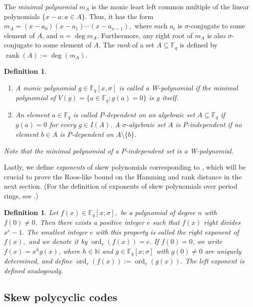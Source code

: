 \documentclass[12pt,paper]{article}
\theoremstyle{plain}
\newtheorem{definition}[theorem]{Definition}
\newcommand{\Fq}{\mathbb{F}_{q}}
\DeclareMathOperator{\ord}{ord}
\begin{document}
The \emph{minimal polynomial} $m_A$ is the monic least left common multiple of the linear polynomials $\{x - a : a \in A\}$. Thus, it has the form  
$
m_A = (x - a_0)(x - a_1) \cdots (x - a_{n-1}),
$
where each $a_i$ is $\sigma$-conjugate to some element of $A$, and $n = \deg m_A$. Furthermore, any right root of $m_A$ is also $\sigma$-conjugate to some element of $A$.
The \emph{rank} of a set $A \subseteq \mathbb{F}_q$ is defined by $\operatorname{rank}(A) := \deg(m_A)$.

\begin{definition}
\begin{enumerate}
    \item 
A monic polynomial $g \in \mathbb{F}_q[x, \sigma]$ is called a \emph{W-polynomial} if the minimal polynomial of $V(g) = \{ a \in \mathbb{F}_q : g(a) = 0 \}$ is $g$ itself. 
\item 
An element $a \in \mathbb{F}_q$ is called \emph{$P$-dependent} on an algebraic set $A\subseteq \Fq$ if $g(a) = 0$ for every $g \in I(A)$. A $\sigma$-algebraic set $A$ is \emph{$P$-independent} if no element $b \in A$ is $P$-dependent on $A \setminus \{b\}$. 
\end{enumerate}    
Note that the minimal polynomial of a $P$-independent set is a W-polynomial.
\end{definition}

Lastly, we define \emph{exponents} of skew polynomials corresponding to \cite[Definition 3.1.]{Cherchem2016}, which will be crucial to prove the Roos-like bound on the Hamming and rank distance in the next section. (For the definition of exponents of skew polynomials over period rings, see \cite{bouzidi2021exponents}.)

\begin{definition}\cite[Definition 3.1.]{Cherchem2016}
    Let $ f(x) \in \Fq[x;\sigma], $ be a polynomial of degree $n$ with $ f(0)\neq 0 $.  Then there exists  a positive integer $ e $ such that $ f(x) $ right divides $ x^{e}-1.$  The smallest integer $e$ with this property is called the \emph{right exponent}  of $f(x),$ and we denote it by $ \ord_r(f(x))=e.$ 
    If $f(0)=0$, we write $f(x)=x^h g(x)$, where $h \in \mathbb{N}$ and $g \in \mathbb{F}_q[x ; \sigma]$ with $g(0) \neq 0$ are uniquely determined, and define $ \ord_r(f(x)):=\ord_r(g(x))$. The \emph{left exponent} is defined analogously.
\end{definition}




\subsection{Skew polycyclic codes}
\end{document}
